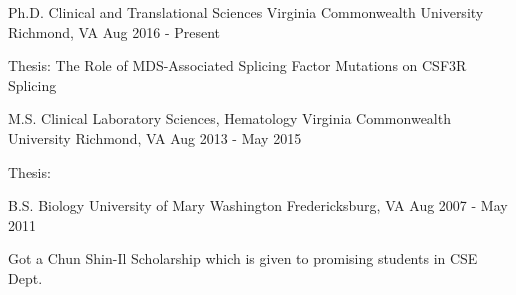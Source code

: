 

\begin{cventries}

\cventry
{Ph.D. Clinical and Translational Sciences} %
{Virginia Commonwealth University} %
{Richmond, VA} %
{Aug 2016 - Present} %
{
  \begin{cvitems} %
    \item {Thesis: The Role of MDS-Associated Splicing Factor Mutations on CSF3R Splicing}
  \end{cvitems}
}

\cventry
{M.S. Clinical Laboratory Sciences, Hematology} %
{Virginia Commonwealth University} %
{Richmond, VA} %
{Aug 2013 - May 2015} %
{
  \begin{cvitems} %
    \item {Thesis: }
  \end{cvitems}
}

  \cventry
    {B.S. Biology} %
    {University of Mary Washington} %
    {Fredericksburg, VA} %
    {Aug 2007 - May 2011} %
    {
      \begin{cvitems} %
        \item {Got a Chun Shin-Il Scholarship which is given to promising students in CSE Dept.}
      \end{cvitems}
    }


\end{cventries}

